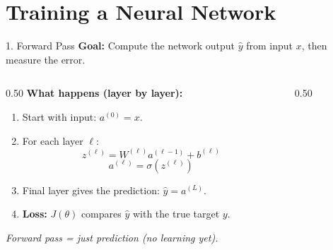 \section{Training a Neural Network}

\begin{frame}{1. Forward Pass}
\textbf{Goal:} Compute the network output $\hat{y}$ from input $x$, then measure the error.

\vspace{0.8em}
\begin{columns}[c]
\begin{column}{0.50\textwidth}
\textbf{What happens (layer by layer):}
\begin{enumerate}
    \item Start with input: $a^{(0)} = x$.
    \item For each layer $\ell$:
    \[
        z^{(\ell)} = W^{(\ell)} a^{(\ell-1)} + b^{(\ell)}   
    \]
    \[
        a^{(\ell)} = \sigma\!\left(z^{(\ell)}\right)
    \]
    \item Final layer gives the prediction: $\hat{y} = a^{(L)}$.
    \item \textbf{Loss:} $J(\theta)$ compares $\hat{y}$ with the true target $y$.
\end{enumerate}

\vspace{0.3em}
\small \textit{Forward pass = just prediction (no learning yet).}
\end{column}

\begin{column}{0.50\textwidth}

\centering
{}
\end{column}
\end{columns}
\end{frame}



